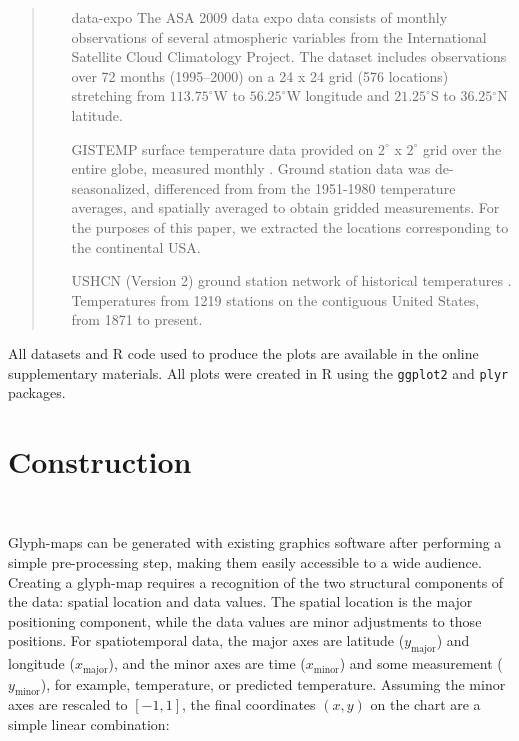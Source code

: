 \documentclass[oneside]{article}
\newcommand\amin{\text{minor}}
\newcommand\amaj{\text{major}}
\begin{document}
\begin{quote}
\begin{itemize}

\item[data-expo] The ASA 2009 data expo data \citep{murrell:2010} consists
  of monthly observations of several atmospheric variables from the
  International Satellite Cloud Climatology Project. The dataset
  includes observations over 72 months (1995--2000) on a 24 x 24 grid
  (576 locations) stretching from $113.75^{\circ}$W to
  $56.25^{\circ}$W longitude and $21.25^{\circ}$S to $36.25{^\circ}$N
  latitude.

\item[GISTEMP] surface temperature data provided on $2^{\circ}$ x
  $2^{\circ}$ grid over the entire globe, measured monthly \citep{GISTEMP}. Ground
  station data was de-seasonalized, differenced from from the
  1951-1980 temperature averages, and spatially averaged to obtain
  gridded measurements. For the purposes of this paper, we extracted
  the locations corresponding to the continental USA. 

\item[USHCN] (Version 2) ground station network of historical
  temperatures \citep{USHCN}. Temperatures from 1219 stations on the
  contiguous United States, from 1871 to present.
  
\end{itemize}
\end{quote}

All datasets and R code used to produce the plots are available in the online supplementary materials. All plots were created in R \citep{R} using the {\tt ggplot2} \citep{me:ggplot2} and {\tt plyr} \citep{me:plyr} packages. 

\section{Construction}~\label{sec:construction}

Glyph-maps can be generated with existing graphics software after performing a simple pre-processing step, making them easily accessible to a wide audience. Creating a glyph-map requires a recognition of the two structural components of the data: spatial location and data values. The spatial location is the major positioning component, while the data values are minor adjustments to those positions. For spatiotemporal data, the major axes are latitude ($y_{\amaj}$) and longitude ($x_{\amaj}$), and the minor axes are time ($x_{\amin}$) and some measurement ($y_{\amin}$), for example, temperature, or predicted temperature. Assuming the minor axes are rescaled to $[-1, 1]$, the final coordinates $(x,y)$ on the chart are a simple linear combination:
\end{document}

